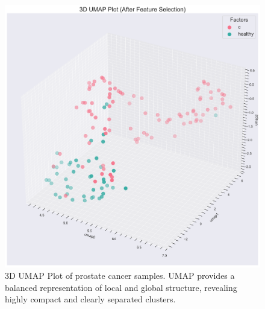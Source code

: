 \documentclass[journal]{IEEEtran}
\begin{document}
\begin{figure}[htbp]
\centering
\includegraphics[width=\linewidth]{prostate_cancer_figures/clustering/after_feature_selection/3D_umap_plot.png}
\caption{3D UMAP Plot of prostate cancer samples. UMAP provides a balanced representation of local and global structure, revealing highly compact and clearly separated clusters.}
\label{fig:prostate_umap}
\end{figure}
\end{document}
